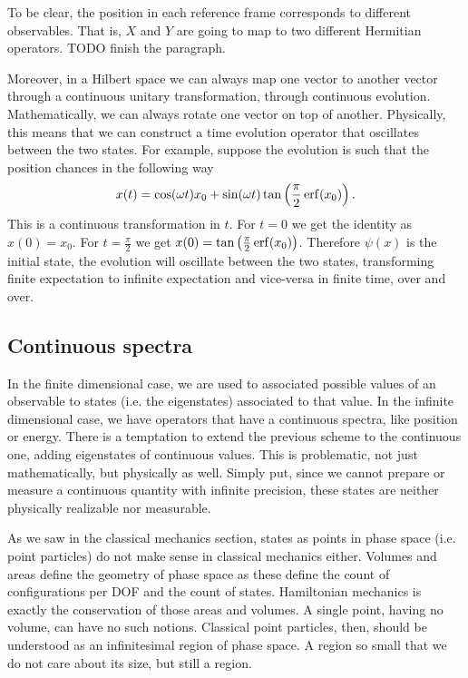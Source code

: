 To be clear, the position in each reference frame corresponds to different observables. That is, $X$ and $Y$ are going to map to two different Hermitian operators. TODO finish the paragraph.

Moreover, in a Hilbert space we can always map one vector to another vector through a continuous unitary transformation, through continuous evolution. Mathematically, we can always rotate one vector on top of another. Physically, this means that we can construct a time evolution operator that oscillates between the two states. For example, suppose the evolution is such that the position chances in the following way
\begin{equation}
	x(t) = \cos(\omega t) x_0 + \sin(\omega t) \tan \left(\frac{\pi}{2}\operatorname{erf}(x_0)\right).
\end{equation}
This is a continuous transformation in $t$. For $t=0$ we get the identity as $x(0) = x_0$. For $t=\frac{\pi}{2}$ we get $x(0) = \tan \left(\frac{\pi}{2}\operatorname{erf}(x_0)\right)$. Therefore $\psi(x)$ is the initial state, the evolution will oscillate between the two states, transforming finite expectation to infinite expectation and vice-versa in finite time, over and over.


\subsection{Continuous spectra}

In the finite dimensional case, we are used to associated possible values of an observable to states (i.e. the eigenstates) associated to that value. In the infinite dimensional case, we have operators that have a continuous spectra, like position or energy. There is a temptation to extend the previous scheme to the continuous one, adding eigenstates of continuous values. This is problematic, not just mathematically, but physically as well. Simply put, since we cannot prepare or measure a continuous quantity with infinite precision, these states are neither physically realizable nor measurable.

As we saw in the classical mechanics section, states as points in phase space (i.e. point particles) do not make sense in classical mechanics either. Volumes and areas define the geometry of phase space as these define the count of configurations per DOF and the count of states. Hamiltonian mechanics is exactly the conservation of those areas and volumes. A single point, having no volume, can have no such notions. Classical point particles, then, should be understood as an infinitesimal region of phase space. A region so small that we do not care about its size, but still a region.

